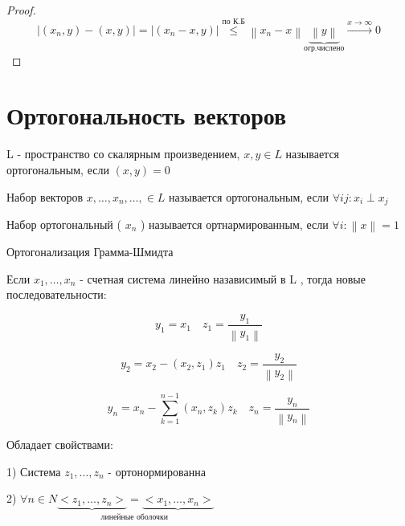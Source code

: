 \documentclass[12pt, a4paper]{report}
\begin{document}
\begin{proof}

    \[ |(x_n, y ) -(x,y )  | = |(x_n- x,y ) | \overset{\text{по К.Б} }{\le}  \left\lVert x_n - x  \right\rVert \underbrace{\left\lVert y \right\rVert}_{\text{огр.числено} } \xrightarrow{x \to  \infty } 0   \] 
\end{proof}

\section{Ортогональность векторов}

\begin{definition}
    L  - пространство со скалярным произведением, \( x, y \in  L \) называется ортогональным, если \( (x,y ) = 0   \) 

    
\end{definition}

\begin{definition}
    Набор векторов \( x, \ldots, x_n, \ldots,   \in  L \) называется ортогональным, если \( \forall  ij : x_i \perp x_j  \) 
\end{definition}


\begin{definition}
    Набор ортогональный ( \( x_n     \) ) называется ортнармированным, если \( \forall  i :  \left\lVert x  \right\rVert = 1   \) 
\end{definition}

Ортогонализация Грамма-Шмидта

Если \( x_1, \ldots, x_n  \)  - счетная система линейно назависимый в  L , тогда новые последовательности: 

\[ y_1 = x_1 \quad  z_1 = \frac{y_1}{\left\lVert y_1  \right\rVert}  \] 

\[ y_2 = x_2 - ( x_2 , z_1 ) z_1  \quad  z_2 = \frac{y_2}{\left\lVert y_2  \right\rVert} \] 

\[ y_n = x_n - \sum ^{n-1 }_{k =1}( x_n , z_k ) z_k  \quad  z_n = \frac{y_n}{\left\lVert y_n  \right\rVert}    \] 

Обладает свойствами: 

1) Система \( z_1, \ldots, z_n   \) - ортонормированна

2) \( \forall n \in  N \underset{\text{линейные оболочки } }{\underbrace{<z_1, \ldots, z_n >} = \underbrace{<x_1, \ldots, x_n>}}\) 

\ifdefined\mainfile
\else
    
\end{document}
